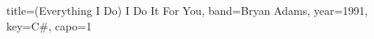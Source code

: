 \documentclass{bekki-leadsheet}
\begin{document}
\begin{song}[transpose-capo=true]{title={(Everything I Do) I Do It For You}, band={Bryan Adams}, year={1991}, key={C#}, capo={1}}



\end{song}
\end{document}
